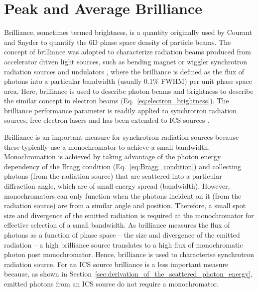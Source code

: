 \documentclass[../main.tex]{subfiles}
\begin{document}
\section{Peak and Average Brilliance}
\label{sec:peak_average_brilliance}

Brilliance, sometimes termed brightness, is a quantity originally used by Courant and Snyder \cite{courant1958theory} to quantify the 6D phase space density of particle beams. The concept of brilliance was adopted to characterize radiation beams produced from accelerator driven light sources, such as bending magnet or wiggler synchrotron radiation sources and undulators \cite{kim1989characteristics}, where the brilliance is defined as the flux of photons into a particular bandwidth (usually 0.1\% FWHM) per unit phase space area. Here, brilliance is used to describe photon beams and brightness to describe the similar concept in electron beams (Eq.~\ref{eq:electron_brightness}). The brilliance performance parameter is readily applied to synchrotron radiation sources, free electron lasers \cite{krinsky1983undulators,kim1987brightness} and has been extended to ICS sources \cite{hartemann2005high,krafft2010compton}.

Brilliance is an important measure for synchrotron radiation sources because these typically use a monochromator to achieve a small bandwidth. Monochromation is achieved by taking advantage of the photon energy dependency of the Bragg condition (Eq.~\ref{eq:Bragg_condition}) and collecting photons (from the radiation source) that are scattered into a particular diffraction angle, which are of small energy spread (bandwidth). However, monochromators can only function when the photons incident on it (from the radiation source) are from a similar angle and position. Therefore, a small spot size and divergence of the emitted radiation is required at the monochromator for effective selection of a small bandwidth. As brilliance measures the flux of photons as a function of phase space -- the size and divergence of the emitted radiation -- a high brilliance source translates to a high flux of monochromatic photon post monochromator. Hence, brilliance is used to characterise synchrotron radiation source. For an ICS source brilliance is a less important measure because, as shown in Section~\ref{sec:derivation_of_the_scattered_photon_energy}, emitted photons from an ICS source do not require a monochromator. 
\end{document}
